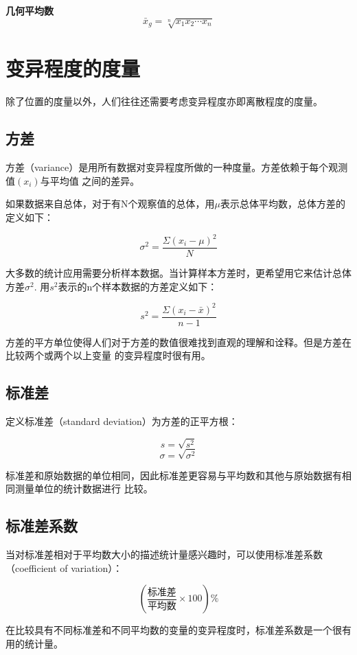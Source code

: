 \documentclass[a4paper]{ctexrep}
\begin{document}
\textbf{几何平均数}
\[\bar{x}_{g} = \sqrt[n]{x_{1}x_{2}\cdots x_{n}}\]


\section{变异程度的度量}
除了位置的度量以外，人们往往还需要考虑变异程度亦即离散程度的度量。

\subsection{方差}
方差（variance）是用所有数据对变异程度所做的一种度量。方差依赖于每个观测值$(x_{i})$与平均值
之间的差异。

如果数据来自总体，对于有N个观察值的总体，用$\mu$表示总体平均数，总体方差的定义如下：

\[\sigma^{2}=\frac{\Sigma(x_{i}-\mu)^{2}}{N}\]

大多数的统计应用需要分析样本数据。当计算样本方差时，更希望用它来估计总体方差$\sigma^{2}$.
用$s^{2}$表示的n个样本数据的方差定义如下：

\[s^{2} = \frac{\Sigma(x_{i} - \bar{x})^{2}}{n - 1}\]

方差的平方单位使得人们对于方差的数值很难找到直观的理解和诠释。但是方差在比较两个或两个以上变量
的变异程度时很有用。

\subsection{标准差}
定义标准差（standard deviation）为方差的正平方根：

\[s = \sqrt{s^{2}}\]
\[\sigma = \sqrt{\sigma^{2}}\]

标准差和原始数据的单位相同，因此标准差更容易与平均数和其他与原始数据有相同测量单位的统计数据进行
比较。

\subsection{标准差系数}
当对标准差相对于平均数大小的描述统计量感兴趣时，可以使用标准差系数（coefficient of variation）：

\[(\frac{\mbox{标准差}}{\mbox{平均数}}\times 100)\%\]

在比较具有不同标准差和不同平均数的变量的变异程度时，标准差系数是一个很有用的统计量。
\end{document}

